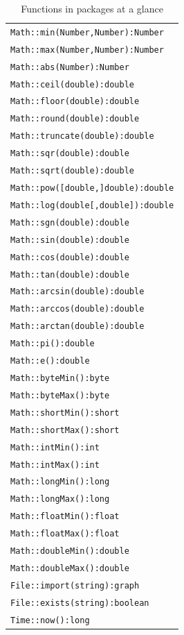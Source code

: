 \begin{table}[htbp]
\centering
\begin{tabular}{|l|}
\hline
\texttt{Math::min(Number,Number):Number}\\
\texttt{Math::max(Number,Number):Number}\\
\texttt{Math::abs(Number):Number}\\
\hline
\texttt{Math::ceil(double):double}\\
\texttt{Math::floor(double):double}\\
\texttt{Math::round(double):double}\\
\texttt{Math::truncate(double):double}\\
\hline
\texttt{Math::sqr(double):double}\\
\texttt{Math::sqrt(double):double}\\
\texttt{Math::pow([double,]double):double}\\
\texttt{Math::log(double[,double]):double}\\
\texttt{Math::sgn(double):double}\\
\hline
\texttt{Math::sin(double):double}\\
\texttt{Math::cos(double):double}\\
\texttt{Math::tan(double):double}\\
\hline
\texttt{Math::arcsin(double):double}\\
\texttt{Math::arccos(double):double}\\
\texttt{Math::arctan(double):double}\\
\hline
\texttt{Math::pi():double}\\
\texttt{Math::e():double}\\
\hline
\texttt{Math::byteMin():byte}\\
\texttt{Math::byteMax():byte}\\
\texttt{Math::shortMin():short}\\
\texttt{Math::shortMax():short}\\
\texttt{Math::intMin():int}\\
\texttt{Math::intMax():int}\\
\texttt{Math::longMin():long}\\
\texttt{Math::longMax():long}\\
\texttt{Math::floatMin():float}\\
\texttt{Math::floatMax():float}\\
\texttt{Math::doubleMin():double}\\
\texttt{Math::doubleMax():double}\\
\hline
\texttt{File::import(string):graph}\\
\texttt{File::exists(string):boolean}\\
\hline
\texttt{Time::now():long}\\
\hline
\end{tabular}
\caption{Functions in packages at a glance}
\label{packagefuncstab}
\end{table}


